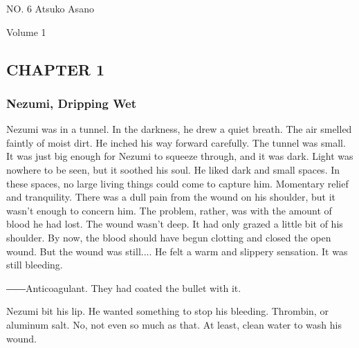 \protect\hypertarget{titlepage.xhtml}{}{}

\protect\hypertarget{index_split_000.html}{}{}

NO. 6 \textbar{} Atsuko Asano

Volume 1

\hypertarget{index_split_000.htmlux5cux23calibre_pb_0}{}

\protect\hypertarget{index_split_001.html}{}{}

\hypertarget{index_split_001.htmlux5cux23calibre_pb_0}{}

\hypertarget{index_split_001.htmlux5cux23calibre_toc_2}{%
\subsection{}\label{index_split_001.htmlux5cux23calibre_toc_2}}

\hypertarget{index_split_001.htmlux5cux23calibre_toc_3}{%
\subsection{CHAPTER
1~}\label{index_split_001.htmlux5cux23calibre_toc_3}}

\subsubsection{Nezumi, Dripping Wet}

Nezumi was in a tunnel. In the darkness, he drew a quiet breath. The air
smelled faintly of moist dirt. He inched his way forward carefully. The
tunnel was small. It was just big enough for Nezumi to squeeze through,
and it was dark. Light was nowhere to be seen, but it soothed his soul.
He liked dark and small spaces. In these spaces, no large living things
could come to capture him. Momentary relief and tranquility. There was a
dull pain from the wound on his shoulder, but it wasn't enough to
concern him. The problem, rather, was with the amount of blood he had
lost. The wound wasn't deep. It had only grazed a little bit of his
shoulder. By now, the blood should have begun clotting and closed the
open wound. But the wound was still.... He felt a warm and slippery
sensation. It was still bleeding.

――Anticoagulant. They had coated the bullet with it.

Nezumi bit his lip. He wanted something to stop his bleeding. Thrombin,
or aluminum salt. No, not even so much as that. At least, clean water to
wash his wound.


